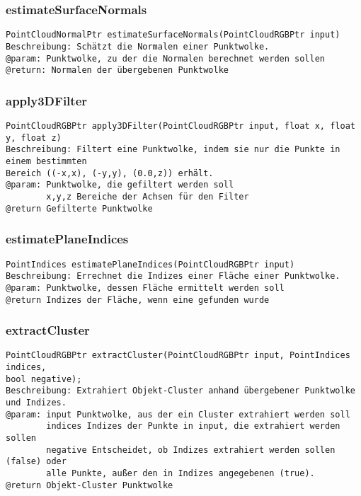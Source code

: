 \documentclass{suturo}
\begin{document}
\subsubsection{estimateSurfaceNormals}
\begin{verbatim}
PointCloudNormalPtr estimateSurfaceNormals(PointCloudRGBPtr input)
Beschreibung: Schätzt die Normalen einer Punktwolke.
@param: Punktwolke, zu der die Normalen berechnet werden sollen
@return: Normalen der übergebenen Punktwolke
\end{verbatim}\label{func:estimatesurfacenormals}

\subsubsection{apply3DFilter}
\begin{verbatim}
PointCloudRGBPtr apply3DFilter(PointCloudRGBPtr input, float x, float y, float z)
Beschreibung: Filtert eine Punktwolke, indem sie nur die Punkte in einem bestimmten
Bereich ((-x,x), (-y,y), (0.0,z)) erhält.
@param: Punktwolke, die gefiltert werden soll
		x,y,z Bereiche der Achsen für den Filter
@return Gefilterte Punktwolke
\end{verbatim}\label{func:apply3dfilter}

\subsubsection{estimatePlaneIndices}
\begin{verbatim}
PointIndices estimatePlaneIndices(PointCloudRGBPtr input)
Beschreibung: Errechnet die Indizes einer Fläche einer Punktwolke.
@param: Punktwolke, dessen Fläche ermittelt werden soll
@return Indizes der Fläche, wenn eine gefunden wurde
\end{verbatim}\label{func:estimateplaneindices}

\subsubsection{extractCluster}
\begin{verbatim}
PointCloudRGBPtr extractCluster(PointCloudRGBPtr input, PointIndices indices, 
bool negative);
Beschreibung: Extrahiert Objekt-Cluster anhand übergebener Punktwolke und Indizes.
@param: input Punktwolke, aus der ein Cluster extrahiert werden soll
		indices Indizes der Punkte in input, die extrahiert werden sollen
		negative Entscheidet, ob Indizes extrahiert werden sollen (false) oder
		alle Punkte, außer den in Indizes angegebenen (true).
@return Objekt-Cluster Punktwolke
\end{verbatim}\label{func:extractcluster}
\end{document}
